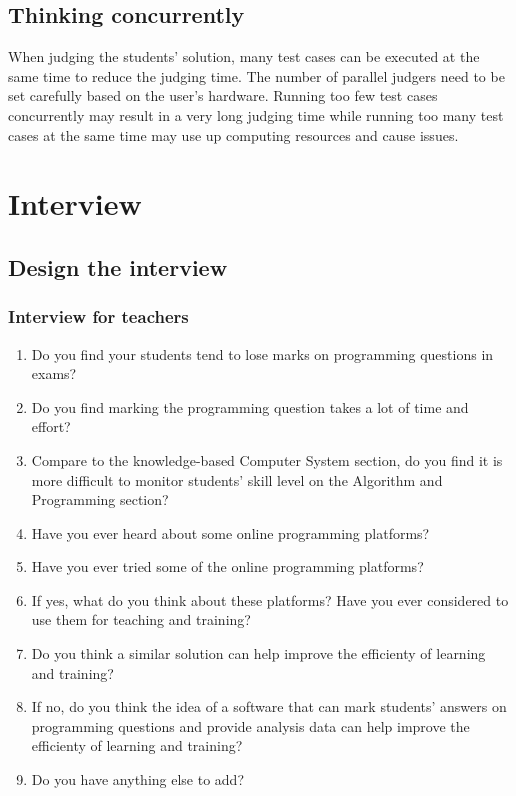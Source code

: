 \documentclass[a4paper]{report}
\begin{document}
\subsection{Thinking concurrently}

When judging the students' solution, many test cases can be executed at the same time to reduce the judging time. The number of parallel judgers need to be set carefully based on the user's hardware. Running too few test cases concurrently may result in a very long judging time while running too many test cases at the same time may use up computing resources and cause issues.

\section{Interview}

\subsection{Design the interview}

\subsubsection{Interview for teachers}

\begin{enumerate}
    \item Do you find your students tend to lose marks on programming questions in exams?
    \item Do you find marking the programming question takes a lot of time and effort?
    \item Compare to the knowledge-based Computer System section, do you find it is more difficult to monitor students' skill level on the Algorithm and Programming section?
    \item Have you ever heard about some online programming platforms?
    \item Have you ever tried some of the online programming platforms?
    \item If yes, what do you think about these platforms? Have you ever considered to use them for teaching and training?
    \item Do you think a similar solution can help improve the efficienty of learning and training?
    \item If no, do you think the idea of a software that can mark students' answers on programming questions and provide analysis data can help improve the efficienty of learning and training?
    \item Do you have anything else to add?
\end{enumerate}
\end{document}
